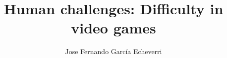 \documentclass[a4paper,12pt,twoside]{report}
\begin{document}

\title{Human challenges: Difficulty in video games}
\author{Jose Fernando García Echeverri}

\maketitle

\restoregeometry

\preface
\cleardoublepage 
%
%


\body



%
%





%
\end{document}
